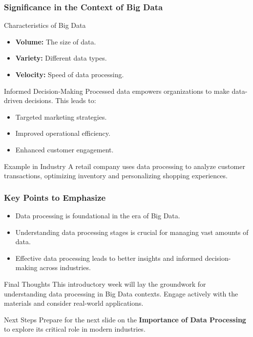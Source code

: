 \documentclass[aspectratio=169]{beamer}
\begin{document}
\begin{frame}[fragile]
    \frametitle{Significance in the Context of Big Data}
    \begin{block}{Characteristics of Big Data}
        \begin{itemize}
            \item \textbf{Volume:} The size of data.
            \item \textbf{Variety:} Different data types.
            \item \textbf{Velocity:} Speed of data processing.
        \end{itemize}
    \end{block}
    
    \begin{block}{Informed Decision-Making}
        Processed data empowers organizations to make data-driven decisions. This leads to:
        \begin{itemize}
            \item Targeted marketing strategies.
            \item Improved operational efficiency.
            \item Enhanced customer engagement.
        \end{itemize}
    \end{block}
    
    \begin{block}{Example in Industry}
        A retail company uses data processing to analyze customer transactions, optimizing inventory and personalizing shopping experiences.
    \end{block}
\end{frame}

\begin{frame}[fragile]
    \frametitle{Key Points to Emphasize}
    \begin{itemize}
        \item Data processing is foundational in the era of Big Data.
        \item Understanding data processing stages is crucial for managing vast amounts of data.
        \item Effective data processing leads to better insights and informed decision-making across industries.
    \end{itemize}

    \begin{block}{Final Thoughts}
        This introductory week will lay the groundwork for understanding data processing in Big Data contexts. Engage actively with the materials and consider real-world applications.
    \end{block}

    \begin{block}{Next Steps}
        Prepare for the next slide on the \textbf{Importance of Data Processing} to explore its critical role in modern industries.
    \end{block}
\end{frame}
\end{document}
